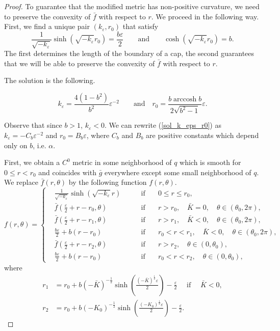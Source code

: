 \documentclass[12pt]{article}
\numberwithin{equation}{section}
\theoremstyle{definition}
\newcommand{\eps}{\varepsilon}
\DeclareMathOperator{\arccosh}{arccosh}
\begin{document}
\begin{proof}
To guarantee that the modified metric has non-positive curvature, we need to preserve the convexity of $\bar f$ with respect to $r$. We proceed in the following way. First, we find a unique pair $(k_{\eps}, r_0)$ that satisfy
\begin{equation}
\frac{1}{\sqrt{-k_\eps}}\sinh\left(\sqrt{-k_\eps}r_0\right)=\frac{b\eps}{2} \qquad \text{and} \qquad \cosh\left(\sqrt{-k_\eps}r_0\right) = b.
\end{equation}
The first determines the length of the boundary of a cap, the second guarantees that we will be able to preserve the convexity of $\bar f$ with respect to $r$. 

The solution is the following.

\begin{equation}\label{sol_k_eps_r0}
k_\eps = \frac{4(1-b^2)}{b^2}\eps^{-2} \qquad \text{and} \quad r_0 = \frac{b\arccosh b}{2\sqrt{b^2-1}}\eps.
\end{equation}

Observe that since $b>1$, $k_{\eps}<0$. We can rewrite (\ref{sol_k_eps_r0}) as $k_\eps = -C_b\eps^{-2}$ and $r_0 = B_b\eps$, where $C_b$ and $B_b$ are positive constants which depend only on $b$, i.e. $\alpha$.  

First, we obtain a $C^0$ metric  in some neighborhood of $q$ which is smooth for $0\leqslant r<r_0$ and coincides with $\bar g$ everywhere except some small neighborhood of $q$. We replace $\bar f(r,\theta)$ by the following function $f(r, \theta)$.
\begin{equation*}
f(r, \theta) = \left\{\begin{aligned}&\frac{1}{\sqrt{-k_\eps}}\sinh(\sqrt{-k_\eps}r) \qquad &\text{if} \quad &0\leqslant r\leqslant r_0,\\
& \bar f\left(\frac{\eps}{2}+r-r_0, \theta \right)\qquad &\text{if} \quad &r> r_0, \quad \bar K=0,\quad \theta\in(\theta_0,2\pi),\\
& \bar f\left(\frac{\eps}{2}+r-r_1, \theta \right)\qquad &\text{if} \quad &r> r_1, \quad \bar K<0,\quad \theta\in(\theta_0,2\pi),\\
& \frac{b\eps}{2}+b(r-r_0)\qquad &\text{if} \quad &r_0<r< r_1, \quad \bar K<0,\quad \theta\in(\theta_0,2\pi),\\
& \bar f\left(\frac{\eps}{2}+r-r_2, \theta \right)\qquad &\text{if} \quad &r> r_2, \quad \theta\in(0,\theta_0),\\
& \frac{b\eps}{2}+b(r-r_0)\qquad &\text{if} \quad &r_0<r< r_2, \quad \theta\in(0,\theta_0),
\end{aligned}\right.
\end{equation*} 
where
\begin{equation*}
\begin{aligned}
r_1 &= r_0+b\left(-\bar K\right)^{-\frac{1}{2}}\sinh\left(\frac{(-\bar K)^{\frac{1}{2}}\eps}{2}\right)-\frac{\eps}{2} \quad \text{ if } \quad \bar K<0 ,\\
r_2 &= r_0+b\left(-K_0\right)^{-\frac{1}{2}}\sinh\left(\frac{(-K_0)^{\frac{1}{2}}\eps}{2}\right)-\frac{\eps}{2}.
\end{aligned}
\end{equation*}


\end{proof}
\end{document}
